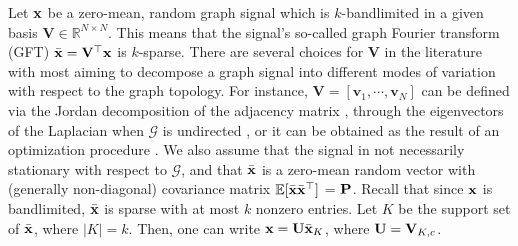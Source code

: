 Let $\x$ be a zero-mean, random graph signal which is $k$-bandlimited in a given basis $\mathbf{V} \in \mathbb{R}^{N \times N}$. This means that the signal's so-called graph Fourier transform (GFT) $\bar{\x} = \V^\top \x$ is $k$-sparse. There are several choices for $\mathbf{V}$ in the literature with most aiming to decompose a graph signal into different modes of variation with respect to the graph topology. For instance, $\mathbf{V} = [\mathbf{v}_{1},\cdots,\mathbf{v}_{N}]$ can be defined via the Jordan decomposition of the adjacency matrix \cite{DSP_freq_analysis,deri2017spectral}, through the eigenvectors of the Laplacian when $\mathcal{G}$ is undirected \cite{shuman2013}, or it can be obtained as the result of an optimization procedure \cite{shafipour2017digraph,sardellitti}. We also assume that the signal in not necessarily stationary with respect to $\mathcal{G}$, and that $\bar{\x}$ is a zero-mean random vector with (generally non-diagonal) covariance matrix $\E[\bar{\x}\bar{\x}^\top]$ = $\P$. Recall that since $\x$ is bandlimited, $\bar{\x}$ is sparse with at most $k$ nonzero entries. Let $K$ be the support set of $\bar{\x}$, where $|K| = k$. Then, one can write $\x = \U\bar{\x}_K$, where $\U = \V_{K,c}$. 

